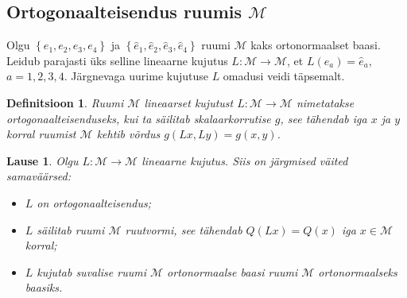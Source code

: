\documentclass[a4paper,12pt]{article}
\newtheorem{definitsioon}{Definitsioon}[section]
\newtheorem{lause}{Lause}[section]
\numberwithin{equation}{section}
\begin{document}
\subsection{Ortogonaalteisendus ruumis $\mathcal{M}$ }

Olgu $\left\lbrace e_1, e_2, e_3, e_4 \right\rbrace$ ja $\left\lbrace \hat{e}_1, \hat{e}_2, \hat{e}_3, \hat{e}_4 \right\rbrace$ ruumi $\mathcal{M}$ kaks ortonormaalset baasi. Leidub parajasti üks selline lineaarne kujutus $L : \mathcal{M} \rightarrow \mathcal{M}$, et $L\left(e_a\right) = \hat{e}_a$, $a = 1, 2, 3, 4$. Järgnevaga uurime kujutuse $L$ omadusi veidi täpsemalt.
\begin{definitsioon}
Ruumi $\mathcal{M}$ lineaarset kujutust $L : \mathcal{M} \rightarrow \mathcal{M}$ nimetatakse \emph{ortogonaalteisenduseks}, kui ta säilitab skalaarkorrutise $g$, see tähendab iga $x$ ja $y$ korral ruumist $\mathcal{M}$ kehtib võrdus $g \left(Lx, Ly \right) = g \left(x, y\right)$.
\end{definitsioon}

\begin{lause} \label{lause:ortogonaalteisendus}
Olgu $L:\mathcal{M} \rightarrow \mathcal{M}$ lineaarne kujutus. Siis on järgmised väited samaväärsed:
\begin{itemize}
\item[(i)] $L$ on ortogonaalteisendus;
\item[(ii)] $L$ säilitab ruumi $\mathcal{M}$ ruutvormi, see tähendab $Q\left(Lx\right) = Q\left(x\right)$ iga $x \in \mathcal{M}$ korral;
\item[(iii)] $L$ kujutab suvalise ruumi $\mathcal{M}$ ortonormaalse baasi ruumi $\mathcal{M}$ ortonormaalseks baasiks.
\end{itemize}
\end{lause} 
\end{document}
